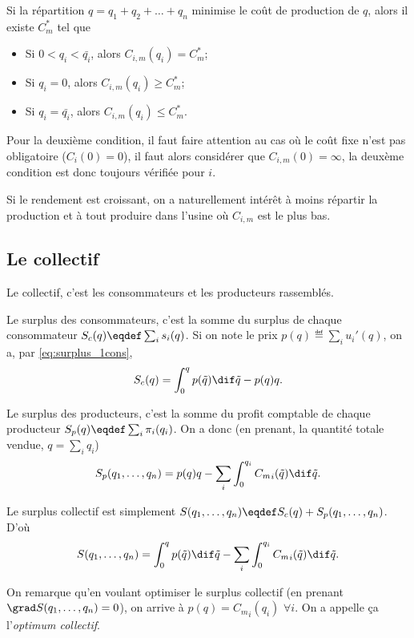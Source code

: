 Si la répartition $q = q_1 + q_2 + \ldots + q_n$ minimise le coût de
production de $q$, alors il existe $C_m^*$ tel que
\begin{itemize}
  \item Si $0 < q_i < \bar{q_i}$, alors $C_{i,m}(q_i) = C_m^*$;
  \item Si $q_i = 0$, alors $C_{i,m}(q_i) \geq C_m^*$;
  \item Si $q_i = \bar{q_i}$, alors $C_{i,m}(q_i) \leq C_m^*$.
\end{itemize}

Pour la deuxième condition,
il faut faire attention au cas où le coût fixe
n'est pas obligatoire ($C_i(0) = 0$),
il faut alors considérer que $C_{i,m}(0)=\infty$,
la deuxème condition est donc toujours vérifiée pour $i$.

Si le rendement est croissant,
on a naturellement intérêt à moins répartir la production et à
tout produire dans l'usine où $C_{i,m}$ est le plus bas.

\subsection{Le collectif}
Le collectif, c'est les consommateurs et les producteurs rassemblés.

Le surplus des consommateurs, c'est la somme du surplus de chaque consommateur
$\surpluscons(q) \eqdef \sum_i s_i(q)$.
Si on note le prix $p(q) \eqdef \sum_i u_i'(q)$, on a, par \eqref{eq:surplus_1cons},
\[ \surpluscons(q) = \int_0^{q}p(\tilde{q}) \dif \tilde{q} - p(q) q. \]

Le surplus des producteurs, c'est la somme du profit comptable de chaque
producteur
$\surplusprod(q) \eqdef \sum_i \pcompt_i(q_i)$.
On a donc (en prenant, la quantité totale vendue, $q = \sum_i q_i$)
\[ \surplusprod(q_1, \ldots, q_n) = p(q)q -
\sum_i \int_0^{q_i} {C_m}_i(\tilde{q}) \dif \tilde{q}. \]

Le surplus collectif est simplement
$\surpluscoll(q_1, \ldots, q_n)
\eqdef \surpluscons(q) + \surplusprod(q_1, \ldots, q_n)$.
D'où
\[ \surpluscoll(q_1, \ldots, q_n) =
  \int_0^{q}p(\tilde{q}) \dif \tilde{q}
- \sum_i \int_0^{q_i} {C_m}_i(\tilde{q}) \dif \tilde{q}. \]

On remarque qu'en voulant optimiser le surplus collectif
(en prenant $\grad \surpluscoll(q_1, \ldots, q_n) = 0$),
on arrive à $p(q) = {C_m}_i(q_i)$ $\forall i$.
On a appelle ça l'\emph{optimum collectif}.

